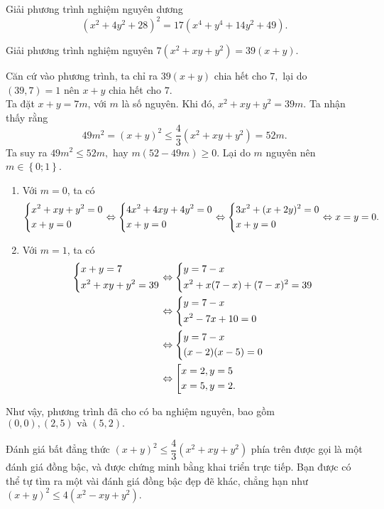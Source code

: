 \begin{gbtt}
Giải phương trình nghiệm nguyên dương
\[\left(x^2+4 y^2+28\right)^2=17\left(x^4+y^4+14 y^2+49\right).\]
\end{gbtt}

\begin{gbtt}\label{dgia.dbac}
Giải phương trình nghiệm nguyên
$7\left(x^2+xy+y^2\right)=39\left(x+y\right).$
\loigiai
{Căn cứ vào phương trình, ta chỉ ra $39(x+y)$ chia hết cho $7,$ lại do $(39,7)=1$ nên $x+y$ chia hết cho $7.$\\
Ta đặt $x+y=7m$, với $m$ là số nguyên. Khi đó, $x^2+xy+y^2=39m$. Ta nhận thấy rằng
$$49m^2=(x+y)^2\le \dfrac{4}{3}\left(x^2+xy+y^2\right)=52m.$$
Ta suy ra $49m^2\le 52m,$ hay $m(52-49m)\ge 0.$ Lại do $m$ nguyên nên $m\in\left\{0;1\right\}$.
\begin{enumerate}
        \item Với $m=0$, ta có $$\left\{\begin{aligned}&x^2+xy+y^2=0\\&x+y=0\end{aligned}\right.
        \Leftrightarrow \left\{\begin{aligned}&4x^2+4xy+4y^2=0\\&x+y=0\end{aligned}\right.
        \Leftrightarrow \left\{\begin{aligned}&3x^2+(x+2y)^2=0\\&x+y=0\end{aligned}\right.
        \Leftrightarrow x=y=0.$$ 
         \item Với $m=1$, ta có
         \begin{align*}
        \left\{\begin{aligned}&x+y=7\\&x^2+xy+y^2=39\end{aligned}\right.
         &\Leftrightarrow \left\{\begin{aligned}&y=7-x \\&x^2+x(7-x)+(7-x)^2=39\end{aligned}\right.
         \\&\Leftrightarrow  \left\{\begin{aligned}&y=7-x \\&x^2-7x+10=0\end{aligned}\right.
         \\&\Leftrightarrow  \left\{\begin{aligned}&y=7-x \\&(x-2)(x-5)=0\end{aligned}\right.         
         \\&\Leftrightarrow\left[\begin{aligned}&x=2,y=5 \\ &x=5,y=2.\end{aligned}\right.
         \end{align*}
\end{enumerate}
Như vậy, phương trình đã cho có ba nghiệm nguyên, bao gồm 
$(0,0),(2,5)\text{ và }(5,2).$}
\begin{luuy}
Đánh giá bất đẳng thức $(x+y)^2\le \dfrac{4}{3}\left(x^2+xy+y^2\right)$ phía trên được gọi là một đánh giá đồng bậc, và được chứng minh bằng khai triển trực tiếp. Bạn được có thể tự tìm ra một vài đánh giá đồng bậc đẹp đẽ khác, chẳng hạn như
$(x+y)^2\le 4\left(x^2-xy+y^2\right).$
\end{luuy}
\end{gbtt}

